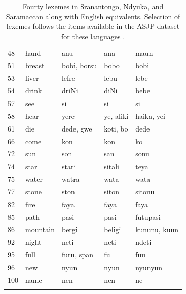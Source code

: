 \begin{longtable}{ p{}p{}|p{}p{}p{} }
    48	&	hand	    &	anu	            &	ana	                &	maun  \\
    51	&	breast	    &	bobi, borsu	    &	bobo	            &	bobi  \\
    53	&	liver	    &	lefre	        &	lebu	            &	lebe  \\
    54	&	drink	    &	driNi	        &	diNi	            &	bebe  \\
    57	&	see	        &	si	            &	si	                &	si  \\
    58	&	hear	    &	yere	        &	ye, aliki	        &	haika, yei  \\
    61	&	die	        &	dede, gwe	    &	koti, bo	        &	dede  \\
    66	&	come	    &	kon	            &	kon	                &	ko  \\
    72	&	sun	        &	son	            &	san	                &	sonu  \\
    74	&	star	    &	stari	        &	sitali	            &	teya  \\
    75	&	water	    &	watra	        &	wata	            &	wata  \\
    77	&	stone	    &	ston	        &	siton	            &	sitonu  \\
    82	&	fire	    &	faya	        &	faya	            &	faya  \\
    85	&	path	    &	pasi	        &	pasi	            &	futupasi  \\
    86	&	mountain	&	bergi	        &	beligi	            &	kununu, kuun  \\
    92	&	night	    &	neti	        &	neti	            &	ndeti  \\
    95	&	full	    &	furu, span	    &	fu	                &	fuu  \\
    96	&	new	        &	nyun	        &	nyun	            &	nyunyun  \\
    100	&	name	    &	nen	            &	nen	                &	ne  \\
    \hline

    \caption{Fourty lexemes in Sranantongo, Ndyuka, and Saramaccan along with English equivalents. Selection of lexemes follows the items available in the ASJP dataset for these languages \parencite{WichmannHolmanBrown2022}.}\label{tab:asjp}
    \end{longtable}
